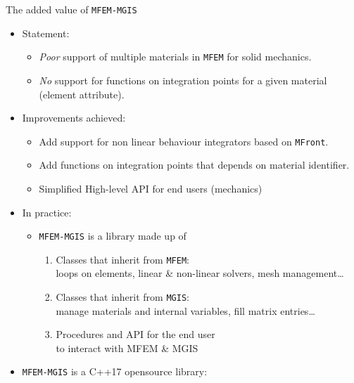 \documentclass{beamer}
\begin{document}
\begin{frame}[fragile]{The
    added value of \texttt{MFEM-MGIS}}
  \begin{itemize}
    \item Statement:
    \begin{itemize}
      \item \emph{Poor} support of multiple materials in
      \texttt{MFEM} for solid mechanics.
      \item \emph{No} support for functions on integration
      points for a given material (element attribute).
    \end{itemize}
    \medskip
    \item Improvements achieved:
    \begin{itemize}
      \item Add support for non linear behaviour integrators
      based on \texttt{MFront}.
      \item Add functions on integration points that depends on
      material identifier.
      \item Simplified High-level API for end users (mechanics)
    \end{itemize}
    \medskip
    \item<2-> In practice:
    \begin{itemize}
      \item \texttt{MFEM-MGIS} is a library made up of
      \begin{enumerate}
        
        \item Classes that inherit from \texttt{MFEM}:\\\hspace*{5mm} loops
        on elements, linear \& non-linear solvers, mesh management\ldots{}
        \item Classes that inherit from \texttt{MGIS}:\\\hspace*{5mm} 
        manage materials and internal variables, fill matrix
        entries\ldots{}
        \item Procedures and API for the end user\\\hspace*{5mm}  to interact with MFEM
        \& MGIS
      \end{enumerate}
    \end{itemize}
    \item<3-> \texttt{MFEM-MGIS} is a C++17 opensource library:
  \end{itemize}
\end{frame}
\end{document}
